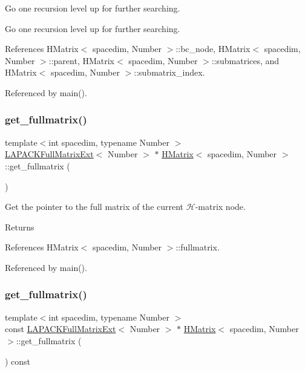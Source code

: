 Go one recursion level up for further searching.

Go one recursion level up for further searching.

References H\+Matrix$<$ spacedim, Number $>$\+::bc\+\_\+node, H\+Matrix$<$ spacedim, Number $>$\+::parent, H\+Matrix$<$ spacedim, Number $>$\+::submatrices, and H\+Matrix$<$ spacedim, Number $>$\+::submatrix\+\_\+index.



Referenced by main().

\mbox{\label{classHMatrix_a9d914c27d4e990d476a4529b2daa64cd}} 
\subsubsection{\texorpdfstring{get\+\_\+fullmatrix()}{get\_fullmatrix()}\hspace{0.1cm}{\footnotesize\ttfamily [1/2]}}
{\footnotesize\ttfamily template$<$int spacedim, typename Number $>$ \\
\hyperlink{classLAPACKFullMatrixExt}{L\+A\+P\+A\+C\+K\+Full\+Matrix\+Ext}$<$ Number $>$ $\ast$ \hyperlink{classHMatrix}{H\+Matrix}$<$ spacedim, Number $>$\+::get\+\_\+fullmatrix (\begin{DoxyParamCaption}{ }\end{DoxyParamCaption})}

Get the pointer to the full matrix of the current $\mathcal{H}$-\/matrix node. \begin{DoxyReturn}{Returns}

\end{DoxyReturn}


References H\+Matrix$<$ spacedim, Number $>$\+::fullmatrix.



Referenced by main().

\mbox{\label{classHMatrix_aed550b5b41a64c6f1bbcde4f8f7eca91}} 
\subsubsection{\texorpdfstring{get\+\_\+fullmatrix()}{get\_fullmatrix()}\hspace{0.1cm}{\footnotesize\ttfamily [2/2]}}
{\footnotesize\ttfamily template$<$int spacedim, typename Number $>$ \\
const \hyperlink{classLAPACKFullMatrixExt}{L\+A\+P\+A\+C\+K\+Full\+Matrix\+Ext}$<$ Number $>$ $\ast$ \hyperlink{classHMatrix}{H\+Matrix}$<$ spacedim, Number $>$\+::get\+\_\+fullmatrix (\begin{DoxyParamCaption}{ }\end{DoxyParamCaption}) const}

